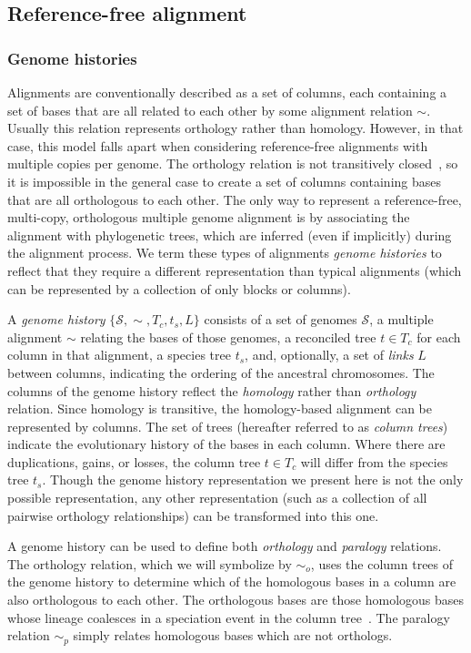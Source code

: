 \documentclass[fleqn,10pt]{wlscirep}
\begin{document}
\subsection{Reference-free alignment}
\subsubsection{Genome histories}
Alignments are conventionally described as a set of columns, each containing a set of bases that are all related to each other by some alignment relation $\sim$.
Usually this relation represents orthology rather than homology.
However, in that case, this model falls apart when considering reference-free alignments with multiple copies per genome.
The orthology relation is not transitively closed~\cite{Koonin2005}, so it is impossible in the general case to create a set of columns containing bases that are all orthologous to each other.
The only way to represent a reference-free, multi-copy, orthologous multiple genome alignment is by associating the alignment with phylogenetic trees, which are inferred (even if implicitly) during the alignment process.
We term these types of alignments \emph{genome histories} to reflect that they require a different representation than typical alignments (which can be represented by a collection of only blocks or columns).

A \emph{genome history} $\{\mathcal{S}, \sim, T_c, t_s, L\}$ consists of a set of genomes $\mathcal{S}$, a multiple alignment $\sim$ relating the bases of those genomes, a reconciled tree $t \in T_c$ for each column in that alignment, a species tree $t_s$, and, optionally, a set of \emph{links} $L$ between columns, indicating the ordering of the ancestral chromosomes.
The columns of the genome history reflect the \emph{homology} rather than \emph{orthology} relation.
Since homology is transitive, the homology-based alignment can be represented by columns.
The set of trees (hereafter referred to as \emph{column trees}) indicate the evolutionary history of the bases in each column.
Where there are duplications, gains, or losses, the column tree $t \in T_c$ will differ from the species tree $t_s$.
Though the genome history representation we present here is not the only possible representation, any other representation (such as a collection of all pairwise orthology relationships) can be transformed into this one.

A genome history can be used to define both \emph{orthology} and \emph{paralogy} relations.
The orthology relation, which we will symbolize by $\sim_o$, uses the column trees of the genome history to determine which of the homologous bases in a column are also orthologous to each other.
The orthologous bases are those homologous bases whose lineage coalesces in a speciation event in the column tree~\cite{Koonin2005}.
The paralogy relation $\sim_p$ simply relates homologous bases which are not orthologs.
\end{document}

